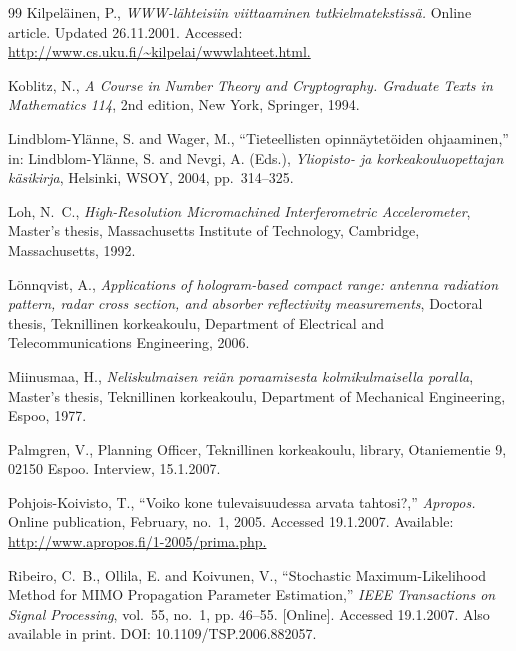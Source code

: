\documentclass[english, 12pt, a4paper, sci, utf8, a-2b, online]{aaltothesis}
\begin{document}
\begin{thebibliography}{99}
   Kilpeläinen, P., 
	\textit{\foreignlanguage{finnish}{WWW-lähteisiin viittaaminen 
	  tutkielmatekstissä}.} Online article. Updated 26.11.2001. 
	Accessed: \url{http://www.cs.uku.fi/~kilpelai/wwwlahteet.html.}

   Koblitz, N., \textit{A Course in Number Theory and 
  	Cryptography. Graduate Texts in Mathematics 114}, 2nd edition, New York, 
    Springer, 1994.

   Lindblom-Ylänne, S. and Wager, M.,
    ``\foreignlanguage{finnish}{Tieteellisten opinnäytetöiden ohjaaminen},'' in:
    Lindblom-Ylänne, S. and Nevgi, A. (Eds.), \textit{Yliopisto- ja
    korkeakouluopettajan käsikirja}, Helsinki, WSOY, 2004, pp.\ 314--325.
 
   Loh, N.\ C., \textit{High-Resolution Micromachined 
  	Interferometric Accelerometer}, Master's thesis, Massachusetts Institute of 
    Technology, Cambridge, Massachusetts, 1992.

   Lönnqvist, A., \textit{Applications of hologram-based 
  	compact range: antenna radiation pattern, radar cross section, and absorber 
  	reflectivity measurements}, Doctoral thesis, Teknillinen korkeakoulu, 
    Department of Electrical and Telecommunications Engineering, 2006.

   Miinusmaa, H., \textit{Neliskulmaisen reiän poraamisesta
	kolmikulmaisella poralla}, Master's thesis, Teknillinen korkeakoulu,
	Department of Mechanical Engineering, Espoo, 1977.

   Palmgren, V., Planning Officer, Teknillinen korkeakoulu, 
    library, Otaniementie 9, 02150 Espoo. Interview, 15.1.2007.

   Pohjois-Koivisto, T., ``\foreignlanguage{finnish}{Voiko kone 
	tulevaisuudessa arvata tahtosi?,}'' \textit{Apropos.} Online publication, 
	February, no.~1, 2005. Accessed 19.1.2007. Available:
	\url{http://www.apropos.fi/1-2005/prima.php.}

   Ribeiro, C.\ B., Ollila, E. and Koivunen, V., ``Stochastic 
	Maximum-Likelihood Method for MIMO Propagation Parameter Estimation,'' 
	\textit{IEEE Transactions on Signal Processing}, vol.~55, no.~1, pp. 46--55.
	[Online]. Accessed 19.1.2007. Also available in print.
	DOI: 10.1109/TSP.2006.882057.


\end{thebibliography}
\end{document}
